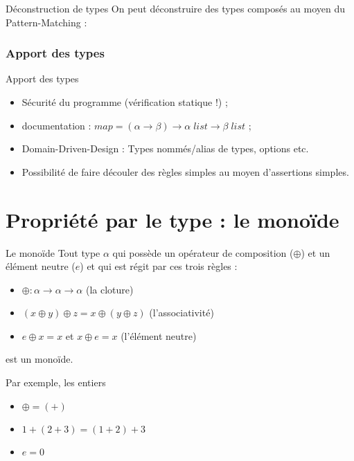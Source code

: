 \documentclass{beamer}
\begin{document}
  \begin{frame}{Déconstruction de types}
    On peut déconstruire des types composés au moyen du \alert{Pattern-Matching} :
    
  \end{frame}

  \subsubsection{Apport des types}
  \begin{frame}{Apport des types}
    \begin{itemize}
      \item \alert{Sécurité} du programme (vérification statique !) ;
      \item documentation : $map = (\alpha \rightarrow \beta) \rightarrow \alpha \; list \rightarrow \beta \; list$ ;
      \item Domain-Driven-Design : Types nommés/alias de types, options etc.
      \item Possibilité de faire découler des règles \alert{simples} au moyen d'assertions \alert{simples}.
     \end{itemize}
  \end{frame}

  \section{Propriété par le type : le monoïde}

  \begin{frame}{Le monoïde}
    Tout type $\alpha$ qui possède un opérateur de composition ($\oplus$) et un élément neutre ($e$) et qui est régit par ces trois règles :
    \begin{itemize}
      \item $\oplus : \alpha \rightarrow \alpha \rightarrow \alpha$ (la cloture)
      \item $(x \oplus y) \oplus z = x \oplus (y \oplus z)$ (l'associativité)
      \item $e \oplus x = x$ et $x \oplus e = x$ (l'élément neutre)
    \end{itemize}
    est un monoïde.
  \end{frame}

  \begin{frame}{Par exemple, les entiers}
    \begin{itemize}
      \item $\oplus = (+)$
      \item $1+(2+3) = (1+2)+3$
      \item $e = 0$
    \end{itemize}
  \end{frame}
\end{document}
